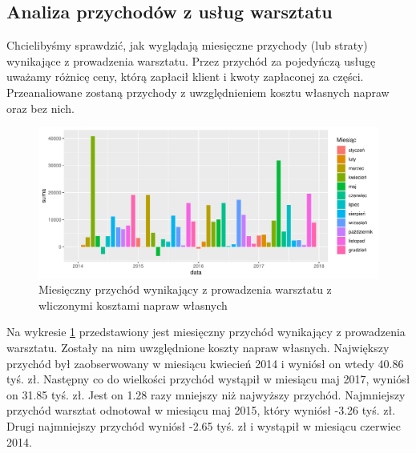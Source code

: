 \documentclass{article}\usepackage[]{graphicx}\usepackage[]{xcolor}
\makeatletter
\def\maxwidth{ %
  \ifdim\Gin@nat@width>\linewidth
    \linewidth
  \else
    \Gin@nat@width
  \fi
}
\newenvironment{knitrout}{}{} %
\makeatother
\begin{document}
\subsection{Analiza przychodów z usług warsztatu}

Chcielibyśmy sprawdzić, jak wyglądają miesięczne przychody (lub straty) wynikające z prowadzenia warsztatu. Przez przychód za pojedyńczą usługę uważamy różnicę ceny, którą zapłacił klient i kwoty zapłaconej za części. Przeanaliowane zostaną przychody z uwzględnieniem kosztu własnych napraw oraz bez nich.

\begin{knitrout}
\color{fgcolor}\begin{figure}[H]

{\centering \includegraphics[width=\maxwidth]{figure/fig_uslugi-1} 

}

\caption[Miesięczny przychód wynikający z prowadzenia warsztatu z wliczonymi kosztami napraw własnych]{Miesięczny przychód wynikający z prowadzenia warsztatu z wliczonymi kosztami napraw własnych}\label{fig:fig_uslugi}
\end{figure}

\end{knitrout}

Na wykresie \ref{fig:fig_uslugi} przedstawiony jest miesięczny przychód wynikający z prowadzenia warsztatu. Zostały na nim uwzględnione koszty napraw własnych. 
Największy przychód był zaobserwowany w miesiącu kwiecień 2014 i wyniósł on wtedy 40.86 tyś. zł.
Następny co do wielkości przychód wystąpił w miesiącu maj 2017, wyniósł on 31.85 tyś. zł. Jest on 1.28 razy mniejszy niż najwyższy przychód.
Najmniejszy przychód warsztat odnotował w miesiącu maj 2015, który wyniósł -3.26 tyś. zł. 
Drugi najmniejszy przychód wyniósł -2.65 tyś. zł i wystąpił w miesiącu czerwiec 2014.
\end{document}
